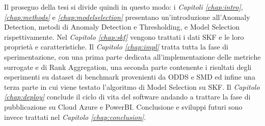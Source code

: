 Il proseguo della tesi si divide quindi in questo modo: i \textit{Capitoli \ref{chap:intro}}, \textit{\ref{chap:methods}} e \textit{\ref{chap:modelselection}} presentano un'introduzione all'Anomaly Detection, metodi di Anomaly Detection e Thresholding, e Model Selection rispettivamente. Nel \textit{Capitolo \ref{chap:skf}} vengono trattati i dati SKF e le loro proprietà e caratteristiche. Il \textit{Capitolo \ref{chap:impl}} tratta tutta la fase di sperimentazione, con una prima parte dedicata all'implementazione delle metriche surrogate e di Rank Aggregation, una seconda parte contenente i risultati degli esperimenti su dataset di benchmark provenienti da ODDS e SMD ed infine una terza parte in cui viene testato l'algoritmo di Model Selection su SKF. Il \textit{Capitolo \ref{chap:deploy}} conclude il ciclo di vita del software andando a trattare la fase di pubblicazione su Cloud Azure e PowerBI.
Conclusione e sviluppi futuri sono invece trattati nel \textit{Capitolo \ref{chap:conclusion}}.